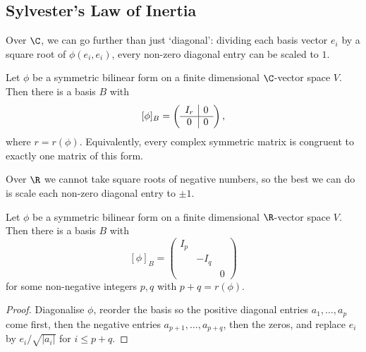 \subsection{Sylvester's Law of Inertia}

Over $\C$, we can go further than just `diagonal': dividing each basis vector $e_i$ by a square root of $\phi(e_i, e_i)$, every non-zero diagonal entry can be scaled to $1$.

\begin{corollary}
    Let $\phi$ be a symmetric bilinear form on a finite dimensional $\C$-vector space $V$. Then there is a basis $B$ with
    $$
    [\phi]_B = \left(\begin{array}{ c | c }
        I_r & 0 \\
        \hline
        0 & 0
      \end{array}\right),
    $$
    where $r = r(\phi)$. Equivalently, every complex symmetric matrix is congruent to exactly one matrix of this form.
\end{corollary}

Over $\R$ we cannot take square roots of negative numbers, so the best we can do is scale each non-zero diagonal entry to $\pm 1$.

\begin{corollary}
    Let $\phi$ be a symmetric bilinear form on a finite dimensional $\R$-vector space $V$. Then there is a basis $B$ with
    $$
    [\phi]_B = \begin{pmatrix}
        I_p & & \\
        & -I_q & \\
        & & 0
    \end{pmatrix}
    $$
    for some non-negative integers $p, q$ with $p + q = r(\phi)$.
\end{corollary}
\begin{proof}
    Diagonalise $\phi$, reorder the basis so the positive diagonal entries $a_1, \dots, a_p$ come first, then the negative entries $a_{p + 1}, \dots, a_{p+q}$, then the zeros, and replace $e_i$ by $e_i / \sqrt{|a_i|}$ for $i \leq p + q$.
\end{proof}

